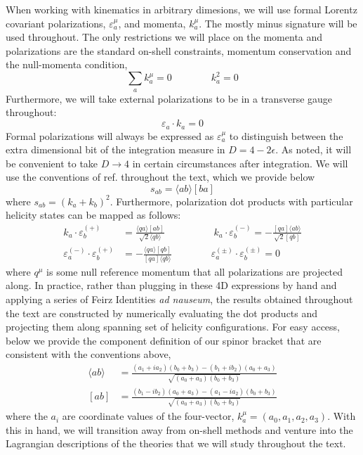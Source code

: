 \documentclass[12pt,letter]{article}
\def\be{\begin{equation}}
\def\ee{\end{equation}}
\begin{document}
When working with kinematics in arbitrary dimesions, we will use formal Lorentz covariant polarizations, $\varepsilon^\mu_a$, and momenta, $k^\mu_a$. The mostly minus signature will be used throughout. The only restrictions we will place on the momenta and polarizations are the standard on-shell constraints, momentum conservation and the null-momenta condition,
\be
\sum_{a} k_a^\mu =0 \qquad \qquad k_a^2 =0
\ee
Furthermore, we will take external polarizations to be in a transverse gauge throughout:
\be
\varepsilon_a \cdot k_a = 0
\ee
Formal polarizations will always be expressed as $\varepsilon_a^\mu$ to distinguish between the extra dimensional bit of the integration measure in $D=4-2\epsilon$. As noted, it will be convenient to take $D\rightarrow 4$ in certain circumstances after integration. We will use the conventions of ref. \cite{jjmcTASI2014} throughout the text, which we provide below
\be
s_{ab} = \langle ab \rangle[ba]
\ee
where $s_{ab} = (k_a+k_b)^2$. Furthermore, polarization dot products with particular helicity states can be mapped as follows:
\begin{align}
k_a \cdot \varepsilon_b^{(+)} &= \frac{\langle q a \rangle[ab]}{\sqrt{2}\langle q b\rangle}
\qquad\quad \qquad
k_a \cdot \varepsilon_b^{(-)} = -\frac{[qa]\langle ab\rangle}{\sqrt{2}[qb]}
\\
\varepsilon_a^{(-)}\cdot \varepsilon_b^{(+)} &= - \frac{\langle q a\rangle [qb]}{ [qa]\langle q b\rangle} 
\qquad \qquad
\varepsilon_a^{(\pm)}\cdot \varepsilon_b^{(\pm)} = 0 
\end{align}
where $q^\mu$ is some null reference momentum that all polarizations are projected along. In practice, rather than plugging in these 4D expressions by hand and applying a series of Feirz Identities \textit{ad nauseum}, the results obtained throughout the text are constructed by numerically evaluating the dot products and projecting them along spanning set of helicity configurations. For easy access, below we provide the component definition of our spinor bracket that are consistent with the conventions above,
\begin{align}
\langle ab \rangle &= \frac{(a_1 + i a_2)(b_0+b_3)-(b_1 + i b_2)(a_0+a_3)}{\sqrt{(a_0+a_3)(b_0+b_3)}}
\\
[ab] &= \frac{(b_1 - i b_2)(a_0+a_3)-(a_1 - i a_2)(b_0+b_3)}{\sqrt{(a_0+a_3)(b_0+b_3)}}
\end{align}
where the $a_i$ are coordinate values of the four-vector, $k^\mu_a = (a_0,a_1,a_2,a_3)$. With this in hand, we will transition away from on-shell methods and venture into the Lagrangian descriptions of the theories that we will study throughout the text. 
\end{document}

